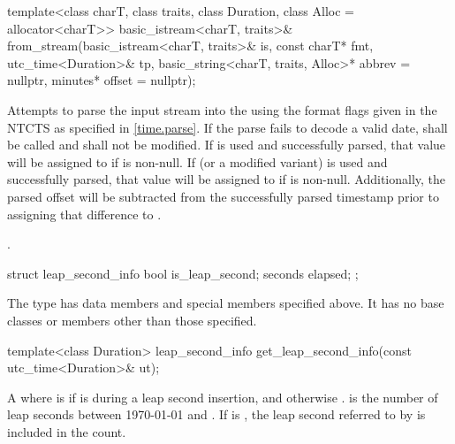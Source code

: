 %
\begin{itemdecl}
template<class charT, class traits, class Duration, class Alloc = allocator<charT>>
  basic_istream<charT, traits>&
    from_stream(basic_istream<charT, traits>& is, const charT* fmt,
                utc_time<Duration>& tp, basic_string<charT, traits, Alloc>* abbrev = nullptr,
                minutes* offset = nullptr);
\end{itemdecl}

\begin{itemdescr}
\pnum
\effects
Attempts to parse the input stream 
into the   using
the format flags given in the NTCTS 
as specified in \ref{time.parse}.
If the parse fails to decode a valid date,
 shall be called
and  shall not be modified.
If  is used and successfully parsed,
that value will be assigned to  if  is non-null.
If  (or a modified variant) is used and successfully parsed,
that value will be assigned to  if  is non-null.
Additionally, the parsed offset will be subtracted from
the successfully parsed timestamp
prior to assigning that difference to .

\pnum
\returns
{}.
\end{itemdescr}

%
\begin{itemdecl}
struct leap_second_info {
  bool    is_leap_second;
  seconds elapsed;
};
\end{itemdecl}

\begin{itemdescr}
\pnum
The type 
has data members and special members specified above.
It has no base classes or members other than those specified.
\end{itemdescr}

%
\begin{itemdecl}
template<class Duration>
  leap_second_info get_leap_second_info(const utc_time<Duration>& ut);
\end{itemdecl}

\begin{itemdescr}
\pnum
\returns
A  where  is 
if  is during a leap second insertion, and otherwise .
 is the number of leap seconds between 1970-01-01 and .
If  is ,
the leap second referred to by  is included in the count.
\end{itemdescr}

